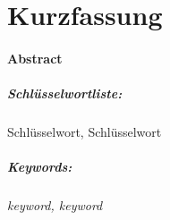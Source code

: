 \chapter*{Kurzfassung}
\thispagestyle{empty}
\blindtext
\vspace{2\baselineskip}

\subsubsection*{Abstract}
\textit{\blindtext@english}
\vspace{10\baselineskip}


\paragraph*{Schlüsselwortliste:}
Schlüsselwort, Schlüsselwort

\vspace{-1\baselineskip}

\paragraph*{Keywords:}
\textit{keyword, keyword}
\clearpage
